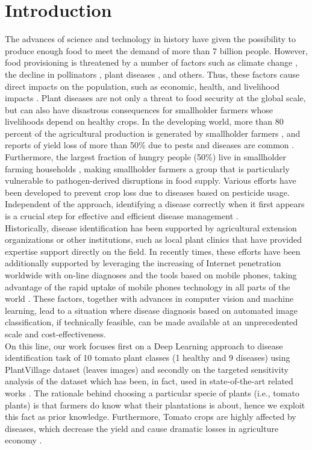 \section{Introduction}
The advances of science and technology in history have given the possibility to produce enough food to meet the demand of more than 7 billion people. However, food provisioning is threatened by a number of factors such as climate change \cite{ref1}, the decline in pollinators \cite{ref2}, plant diseases \cite{ref3}, and others. Thus, these factors cause direct impacts on the population, such as economic, health, and livelihood impacts \cite{ref4}. Plant diseases are not only a threat to food security at the global scale, but can also have disastrous consequences for smallholder farmers whose livelihoods depend on healthy crops. In the developing world, more than 80 percent of the agricultural production is generated by smallholder farmers \cite{ref5}, and reports of yield loss of more than 50\% due to pests and diseases are common \cite{ref6}. Furthermore, the largest fraction of hungry people (50\%) live in smallholder farming households \cite{ref7}, making smallholder farmers a group that is particularly vulnerable to pathogen-derived disruptions in food supply.
Various efforts have been developed to prevent crop loss due to diseases based on pesticide usage. Independent of the approach, identifying a disease correctly when it first appears is a crucial step for effective and efficient disease management \cite{ref8}.
\\\indent
Historically, disease identification has been supported by agricultural extension organizations or other institutions, such as local plant clinics that have provided expertise support directly on the field. In recently times, these efforts have been additionally supported by leveraging the increasing of Internet penetration worldwide with on-line diagnoses and the tools based on mobile phones, taking advantage of the rapid uptake of mobile phones technology in all parts of the world \cite{ref9}. These factors, together with advances in computer vision and machine learning, lead to a situation where disease diagnosis based on automated image classification, if technically feasible, can be made available at an unprecedented scale and cost-effectiveness.
\\\indent
On this line, our work focuses first on a Deep Learning approach to disease identification task of 10 tomato plant classes (1 healthy and 9 diseases) using PlantVillage dataset (leaves images) \cite{PlantVillage} and secondly on the targeted sensitivity analysis of the dataset which has been, in fact, used in state-of-the-art related works \cite{ref11, ref10}. The rationale behind choosing a particular specie of plants (i.e., tomato plants) is that farmers do know what their plantations is about, hence we exploit this fact as prior knowledge. Furthermore, Tomato crops are highly affected by diseases, which decrease the yield and cause dramatic losses in agriculture economy \cite{ref}.

